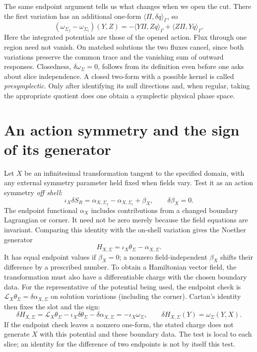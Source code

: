 The same endpoint argument tells us what changes when we open the cut.
There the first variation
has an additional one-form $\langle\Pi,\delta q\rangle_\Gamma$, so
\[
 (\omega_{\Sigma_f}-\omega_{\Sigma_i})(Y,Z)
 =-\langle Y\Pi,Zq\rangle_\Gamma+\langle Z\Pi,Yq\rangle_\Gamma.
\]
Here the integrated potentials are those of the opened action. Flux through
one region need not vanish. On matched solutions the two fluxes cancel,
since both variations preserve the common trace and the vanishing sum of
outward responses. Closedness, $\delta\omega_\Sigma=0$, follows from its
definition even before one asks about slice independence. A closed two-form
with a possible kernel is called \emph{presymplectic}. Only after identifying
its null directions and, when regular, taking the appropriate quotient does
one obtain a symplectic physical phase space.

\section{An action symmetry and the sign of its generator}
Let $X$ be an infinitesimal transformation tangent to the specified domain,
with any external symmetry parameter held fixed when fields vary. Test it as
an action symmetry \emph{off shell}:
\[
 \iota_X\delta S_R=\alpha_{X,\Sigma_f}-\alpha_{X,\Sigma_i}+\beta_X,
 \qquad \delta\beta_X=0.
\]
The endpoint functional $\alpha_X$ includes contributions from a changed
boundary Lagrangian or corner. It need not be zero merely because the field
equations are invariant. Comparing this identity with the on-shell variation
gives the Noether generator \cite{HW}
\begin{equation}
 H_{X,\Sigma}=\iota_X\theta_\Sigma-\alpha_{X,\Sigma}.
 \label{eq:05-noether}
\end{equation}
It has equal endpoint values if $\beta_X=0$; a nonzero field-independent
$\beta_X$ shifts their difference by a prescribed number. To obtain a
Hamiltonian vector field, the transformation must also have a differentiable
charge with the chosen boundary data. For the representative of the potential
being used, the endpoint check is
$\mathcal L_X\theta_\Sigma=\delta\alpha_{X,\Sigma}$ on solution variations
(including the corner). Cartan's identity then fixes the slot and the sign:
\[
 \delta H_{X,\Sigma}=
 \mathcal L_X\theta_\Sigma-\iota_X\delta\theta_\Sigma-\delta\alpha_{X,\Sigma}
 =-\iota_X\omega_\Sigma,\qquad
 \delta H_{X,\Sigma}(Y)=\omega_\Sigma(Y,X).
\]
If the endpoint check leaves a nonzero one-form, the stated charge does not
generate $X$ with this potential and these boundary data. The test is local
to each slice; an identity for the difference of two endpoints is not by
itself this test.


